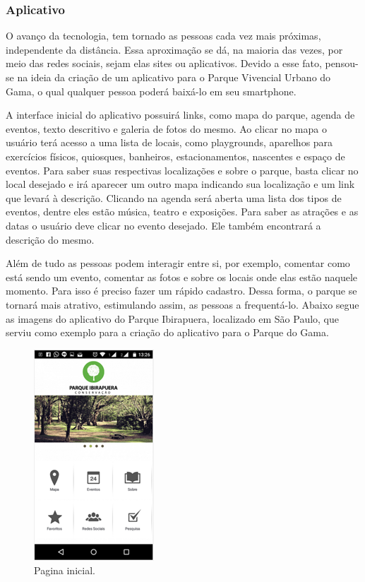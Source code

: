 \subsubsection{Aplicativo}

	O avanço da tecnologia, tem tornado as pessoas cada vez mais próximas, independente da distância. Essa aproximação se dá, na maioria das vezes, por meio das redes sociais, sejam elas sites ou aplicativos. Devido a esse fato, pensou-se na ideia da criação de um aplicativo para o Parque Vivencial Urbano do Gama, o qual qualquer pessoa poderá baixá-lo em seu smartphone.
	
	A interface inicial do aplicativo possuirá links, como mapa do parque, agenda de eventos, texto descritivo e galeria de fotos do mesmo. Ao clicar no mapa o usuário terá acesso a uma lista de locais, como playgrounds, aparelhos para exercícios físicos, quiosques, banheiros, estacionamentos, nascentes e espaço de eventos. Para saber suas respectivas localizações e sobre o parque, basta clicar no local desejado e irá aparecer um outro mapa indicando sua localização e um link que levará à descrição. Clicando na agenda será aberta uma lista dos tipos de eventos, dentre eles estão música, teatro e exposições. Para saber as atrações e as datas o usuário deve clicar no evento desejado. Ele também encontrará a descrição do mesmo.

	Além de tudo as pessoas podem interagir entre si, por exemplo, comentar como está sendo um evento, comentar as fotos e sobre os locais onde elas estão naquele momento. Para isso é preciso fazer um rápido cadastro. Dessa forma, o parque se tornará mais atrativo, estimulando assim, as pessoas a frequentá-lo. 
Abaixo segue as imagens do aplicativo do Parque Ibirapuera, localizado em São Paulo, que serviu como exemplo para a criação do aplicativo para o Parque do Gama.

\begin{figure}[H]
	 \centering
	\label{Pagina inicial do aplicativo}
	 \includegraphics[keepaspectratio=true,scale=0.8]{interacao/17.png}
	 \caption{Pagina inicial.}
\end{figure}
	

